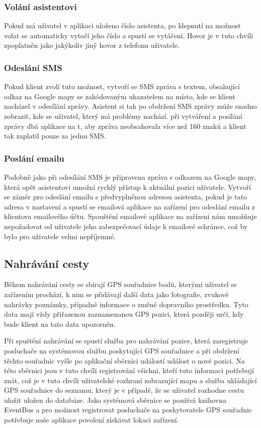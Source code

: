 \documentclass[czech,master,public,dept460,male,java,cpdeclaration]{diploma}
\begin{document}
\subsubsection{Volání asistentovi}
Pokud má uživatel v aplikaci uloženo číslo asistenta, po klepnutí na možnost volat se automaticky
vytočí jeho číslo a spustí se vytáčení. Hovor je v tuto chvíli zpoplatněn jako jakýkoliv jiný hovor
z telefonu uživatele.

\subsubsection{Odeslání SMS}
Pokud klient zvolí tuto možnost, vytvoří se SMS zpráva s textem, obsahující odkaz na Google mapy
se zakódovaným ukazatelem na místo, kde se klient nacházel v odesílání zprávy. Asistent si tak po obdržení
SMS zprávy může snadno zobrazit, kde se uživatel, který má problémy nachází. při vytváření a posílání zprávy
dbá aplikace na t, aby zpráva neobsahovala více než 160 znaků a klient tak zaplatil pouze za jednu SMS.

\subsubsection{Poslání emailu}
Podobně jako při odesílání SMS je připravena zpráva s odkazem na Google mapy, která opět asistentovi
umožní rychlý přístup k aktuální pozici uživatele. Vytvoří se záměr pro odeslání emailu s předvyplněnou
adresou asistenta, pokud je tato adresa v nastavení a spustí se emailová aplikace na zařízení pro odeslání
emailu z klientova emailového účtu. Spouštění emailové aplikace na zařízení nám umožňuje nepožadovat
od uživatele jeho zabezpečovací údaje k emailové schránce, což by bylo pro uživatele velmi nepříjemné.



\subsection{Nahrávání cesty}
Během nahrávání cesty se sbírají GPS souřadnice bodů, kterými uživatel se zařízením prochází,
k nim se přidávají další data jako fotografie, zvukové nahrávky poznámky,
případně informace o změně dopravního prostředku. Tyto data mají vždy přiřazenou zaznamenanou
GPS pozici, která později určí, kdy bude klient na tato data upozorněn.

Při spuštění nahrávání se spustí služba pro nahrávání pozice, která zaregistruje
posluchače na systémovou službu poskytující GPS souřadnice a při obdržení těchto souřadnic
vyšle po aplikační sběrnici událostí událost o nové pozici. Na této sběrnici jsou v tuto chvíli
registrování všichni, kteří tuto informaci potřebují znát, což je v tuto chvíli uživatelské rozhraní
zobrazující mapu a služba ukládající GPS souřadnice do seznamu, který je v případě, že se uživatel
rozhodne cestu uložit uložen do databáze. Jako systémová sběrnice se používá knihovna EventBus a pro
možnost registrovat posluchače na poskytovatele GPS souřadnic potřebuje naše aplikace povolení
získávat lokaci zařízení.
\end{document}
